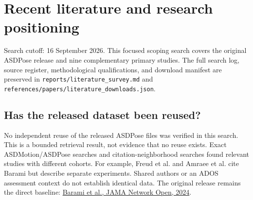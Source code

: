 \section{Recent literature and research positioning}
\label{sec:literature}
\noindent Search cutoff: 16 September 2026. This focused scoping search covers the
original ASDPose release and nine complementary primary studies. The full search
log, source register, methodological qualifications, and download manifest are
preserved in \texttt{reports/literature\_survey.md} and
\texttt{references/papers/literature\_downloads.json}.

\subsection{Has the released dataset been reused?}
No independent reuse of the released ASDPose files was verified in this search.
This is a bounded retrieval result, not evidence that no reuse exists. Exact
ASDMotion/ASDPose searches and citation-neighborhood searches found relevant
studies with different cohorts. For example, Freud et al. and Amraee et al. cite
Barami but describe separate experiments. Shared authors or an ADOS assessment
context do not establish identical data. The original release remains the direct
baseline: \href{https://doi.org/10.1001/jamanetworkopen.2024.32851}{Barami et al.,
JAMA Network Open, 2024}.

